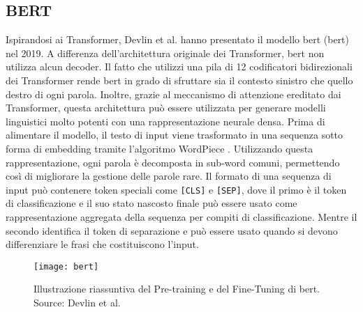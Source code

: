 \subsection{BERT}\label{bert_section}
Ispirandosi ai Transformer, Devlin et al. \cite{devlin2018bert} hanno presentato il modello \acrshort{bert} (\acrlong{bert}) nel 2019. A differenza dell'architettura originale dei Transformer, \acrshort{bert} non utilizza alcun decoder. Il fatto che utilizzi una pila di 12 codificatori bidirezionali dei Transformer rende \acrshort{bert} in grado di sfruttare sia il contesto sinistro che quello destro di ogni parola. Inoltre, grazie al meccanismo di attenzione ereditato dai Transformer, questa architettura può essere utilizzata per generare modelli linguistici molto potenti con una rappresentazione neurale densa.
Prima di alimentare il modello, il testo di input viene trasformato in una sequenza sotto forma di embedding tramite l'algoritmo WordPiece \cite{wu2016google}. Utilizzando questa rappresentazione, ogni parola è decomposta in sub-word comuni, permettendo così di migliorare la gestione delle parole rare. Il formato di una sequenza di input può contenere token speciali come \texttt{[CLS]} e \texttt{[SEP]}, dove il primo è il token di classificazione e il suo stato nascosto finale può essere usato come rappresentazione aggregata della sequenza per compiti di classificazione. Mentre il secondo identifica il token di separazione e può essere usato quando si devono differenziare le frasi che costituiscono l'input.

\begin{figure}[ht]
\centering
\texttt{[image: bert]}
\caption{Illustrazione riassuntiva del Pre-training e del Fine-Tuning di \acrshort{bert}. Source: Devlin et al. \cite{devlin2018bert}}\label{figura:bert}
\end{figure}

